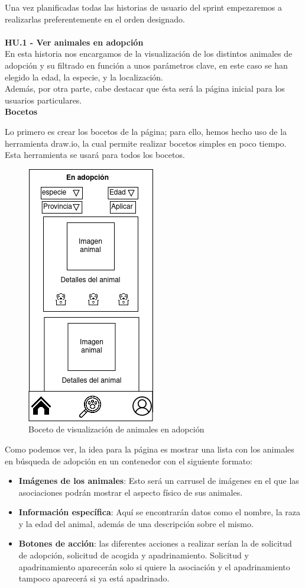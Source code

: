 Una vez planificadas todas las historias de usuario del sprint empezaremos a realizarlas preferentemente en el orden designado. \\ \\

\Large{\textbf{HU.1 - Ver animales en adopción}} \\

En esta historia nos encargamos de la visualización de los distintos animales de adopción y su filtrado en función a unos parámetros clave, en este caso se han elegido la edad, la especie, y la localización. \\

Además, por otra parte, cabe destacar que ésta será la página inicial para los usuarios particulares. \\ 

\textbf{Bocetos}

Lo primero es crear los bocetos de la página; para ello, hemos hecho uso de la herramienta draw.io, la cual permite realizar bocetos simples en poco tiempo. Esta herramienta se usará para todos los bocetos.

\begin{figure}[H]
	\centering
	\includegraphics[width=0.31\linewidth]{"bocetos/iteracion 1/adopciones"}
	\caption{Boceto de visualización de animales en adopción}
	\label{fig:adopciones}
\end{figure}

Como podemos ver, la idea para la página es mostrar una lista con los animales en búsqueda de adopción en un contenedor con el siguiente formato:

\begin{itemize}
	\item \textbf{Imágenes de los animales}: Esto será un carrusel de imágenes en el que las asociaciones podrán mostrar el aspecto físico de sus animales.
	\item \textbf{Información específica}: Aquí se encontrarán datos como el nombre, la raza y la edad del animal, además de una descripción sobre el mismo.
	\item \textbf{Botones de acción}: las diferentes acciones a realizar serían la de solicitud de adopción, solicitud de acogida y apadrinamiento. Solicitud y apadrinamiento aparecerán solo si quiere la asociación y el apadrinamiento tampoco aparecerá si ya está apadrinado.
\end{itemize}

